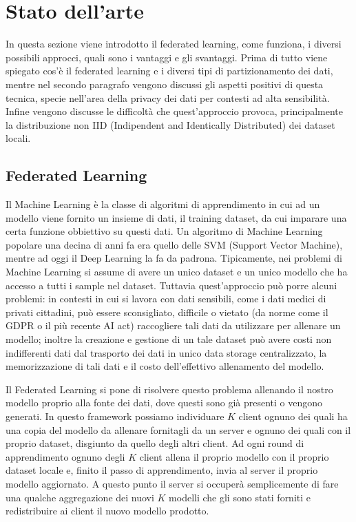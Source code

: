 \chapter{Stato dell'arte}
In questa sezione viene introdotto il federated learning, come funziona,
i diversi possibili approcci, quali sono i vantaggi e gli svantaggi.
Prima di tutto viene spiegato cos'è il federated learning e i diversi tipi
di partizionamento dei dati, mentre nel secondo paragrafo vengono discussi
gli aspetti positivi di questa tecnica, specie nell'area della privacy 
dei dati per contesti ad alta sensibilità. Infine vengono discusse le
difficoltà che quest'approccio provoca, principalmente la distribuzione non
IID (Indipendent and Identically Distributed) dei dataset locali.

\section{Federated Learning}
Il Machine Learning è la classe di algoritmi di apprendimento in cui ad un
modello viene fornito un insieme di dati, il training dataset, da cui
imparare una certa funzione obbiettivo su questi dati. Un algoritmo di 
Machine Learning popolare una decina di anni fa era quello delle SVM
(Support Vector Machine), mentre ad oggi il Deep Learning la fa da padrona.
Tipicamente, nei problemi di Machine Learning si assume di avere un unico
dataset e un unico modello che ha accesso a tutti i sample nel dataset.
Tuttavia quest'approccio può porre alcuni problemi: in contesti in cui si
lavora con dati sensibili, come i dati medici di privati cittadini, può 
essere sconsigliato, difficile o vietato (da norme come il GDPR o il più
recente AI act) raccogliere tali dati da utilizzare per allenare un modello;
inoltre la creazione e gestione di un tale dataset può avere costi non
indifferenti dati dal trasporto dei dati in unico data storage centralizzato,
la memorizzazione di tali dati e il costo dell'effettivo allenamento del
modello.

Il Federated Learning si pone di risolvere questo problema allenando il nostro
modello proprio alla fonte dei dati, dove questi sono già presenti o vengono
generati. In questo framework possiamo individuare \(K\) client ognuno dei quali
ha una copia del modello da allenare fornitagli da un server e ognuno dei quali
con il proprio dataset, disgiunto da quello degli altri client.
Ad ogni round di apprendimento ognuno degli \(K\) client allena il proprio modello 
con il proprio dataset locale e, finito il passo di apprendimento, invia al
server il proprio modello aggiornato. A questo punto il server si occuperà 
semplicemente di fare una qualche aggregazione dei nuovi \(K\) modelli che gli sono
stati forniti e redistribuire ai client il nuovo modello prodotto.

